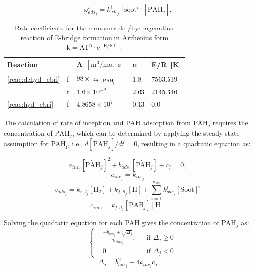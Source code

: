 \begin{equation}
	\omega^i_{ads_j} = k^i_{ads_{j}} [\mathrm{soot}^i] [\mathrm{\dot{PAH}}_j].
\end{equation}



\renewcommand{\arraystretch}{1.5}
\begin{table}
	\caption[Rate coefficients for the monomer de-/hydrogenation reaction of E-bridge formation in Arrhenius form $\mathrm{k=AT^n\cdot e^{-E/RT}}$.]{Rate coefficients for the monomer de-/hydrogenation reaction of E-bridge formation in Arrhenius form $\mathrm{k=AT^n\cdot e^{-E/RT}}$~\citep{frenklach2020mechanism}.}
	\label{tab:Ebridge}
	\centering
	\begin{tabular}{l l l l l}
		\hline
		Reaction & \hspace{0.1cm} & A~$\mathrm{\left[{m^3}/{mol\cdot s} \right]}$ & n & {E}/{R}~[K]  \\
		\hline
		\eqref{reac:dehyd_ebri} & f & $98\times$ $\mathrm{n_{C, PAH_j}}$ & 1.8 & 7563.519 \\
		& r & $1.6\times 10^{-2}$ & 2.63 & 2145.346\\
		\eqref{reac:hyd_ebri} & f & $4.8658\times10^7
		$ & 0.13 & 0.0\\
		\hline
	\end{tabular}
\end{table}



The calculation of rate of inception and PAH adsorption from $\mathrm{PAH}_j$ requires the concentration of $\mathrm{\dot{PAH}}_j$, which can be determined by applying the steady-state assumption for $\mathrm{\dot{PAH}_j}$, i.e., $d[\mathrm{\dot{PAH}}_j]/dt=0$, resulting in a quadratic equation as:


\begin{equation}
	a_{inc_j}[\mathrm{\dot{PAH}}_j]^2+
	b_{ads_j}[\mathrm{\dot{PAH}}_j] + c_j = 0,
\end{equation}
\begin{equation}
	a_{inc_j}=k_{inc_j}
\end{equation}
\begin{equation}
	b_{ads_j}=k_{r,d_j}[\mathrm{H_2}]+k_{f,h_j}[\mathrm{H}]+\sum_{i=1}^{n_{sec}}k^i_{ads_j}[\mathrm{Soot}]^i
\end{equation}
\begin{equation}
	c_{inc_j}=k_{f,d_j}[\mathrm{PAH}_j][\mathrm{H}]
\end{equation}

Solving the quadratic equation for each PAH gives the concentration of $\mathrm{\mathrm{\dot{PAH}}}_j$ as:
\begin{equation}
	[\mathrm{\mathrm{\dot{PAH}}}_j]=
	\left\{
	\begin{aligned}
		&\frac{-b_{ads_j}+\sqrt{\Delta_j}}{2a_{inc_j}},
		&&
		\text{if } \Delta_j \ge 0
		\\
		& 0 
		&&
		\text{if } \Delta_j < 0
	\end{aligned}
	\right.
	\label{eqn:rad_ebri}
\end{equation}
\begin{equation}
	\Delta_j = b_{ads_j}^2-4a_{inc_j}c_{j}
	\label{eqn:delta_ebri}
\end{equation}

